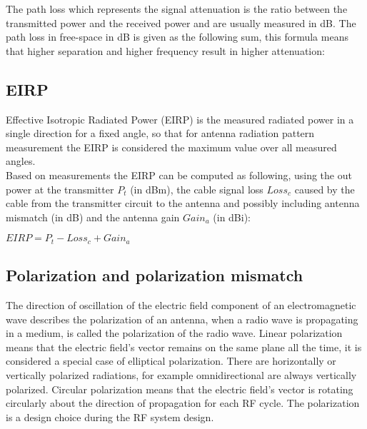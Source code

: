 The path loss which represents the signal attenuation is the ratio between the transmitted power and the received power and are usually measured in dB. The path loss in free-space in dB is given as the following sum, this formula means that higher separation and higher frequency result in higher attenuation:


\subsection{EIRP}

Effective Isotropic Radiated Power (EIRP) is the measured radiated power in a single direction for a fixed angle, so that for antenna radiation pattern measurement the EIRP is considered the maximum value over all measured angles.\\
Based on measurements the EIRP can be computed as following, using the out power at the transmitter $P_{t}$ (in dBm), the cable signal loss $Loss_{c}$ caused by the cable from the transmitter circuit to the antenna and possibly including antenna mismatch (in dB) and the antenna gain $Gain_{a}$ (in dBi):

$EIRP= P_{t} - Loss_{c}+  Gain_{a}$ 


\subsection{Polarization and polarization mismatch}

 The direction of oscillation of the electric field component of an electromagnetic wave describes the polarization of an antenna, when a radio wave is propagating in a medium, is called the polarization of the radio wave. Linear polarization means that the electric field’s vector remains on the same plane all the time, it is considered a special case of elliptical polarization. There are horizontally or vertically polarized radiations, for example omnidirectional are always vertically polarized. Circular polarization means that the electric field’s vector is rotating circularly about the direction of propagation for each RF cycle. The polarization is a design choice during the RF system design.


